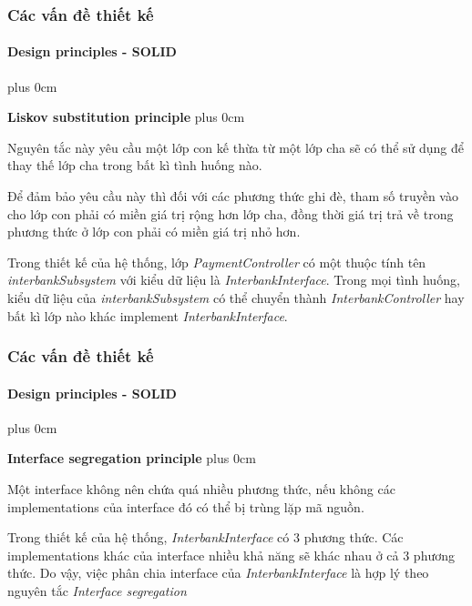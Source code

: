 \documentclass[11pt]{beamer}
\renewcommand{\raggedright}{\leftskip=0pt \rightskip=0pt plus 0cm}
\let\olditemize=\itemize
\renewenvironment{itemize}{\olditemize\raggedright}{\endlist}
\begin{document}
\begin{frame}[plain]
	\frametitle{Các vấn đề thiết kế}
	\framesubtitle{Design principles - SOLID}
	\begin{itemize}
		\item \textbf{Liskov substitution principle}
		\begin{itemize}
			\item Nguyên tắc này yêu cầu một lớp con kế thừa từ một lớp cha sẽ có thể sử dụng để thay thế
lớp cha trong bất kì tình huống nào.\\[5pt]
			\item Để đảm bảo yêu cầu này thì đối với các phương thức ghi đè, tham số truyền vào cho lớp con phải có miền giá trị rộng hơn lớp cha, đồng thời giá trị trả về trong phương thức ở lớp con phải có miền giá trị nhỏ hơn.\\[5pt]
			\item Trong thiết kế của hệ thống, lớp \textit{PaymentController} có một thuộc tính tên \textit{interbankSubsystem} với kiểu dữ liệu là \textit{InterbankInterface}. Trong mọi tình huống, kiểu dữ liệu của \textit{interbankSubsystem} có thể chuyển thành \textit{InterbankController}  hay bất kì lớp nào khác implement \textit{InterbankInterface}.
		\end{itemize}
	\end{itemize}
\end{frame}
\begin{frame}[plain]
	\frametitle{Các vấn đề thiết kế}
	\framesubtitle{Design principles - SOLID}
	\begin{itemize}
		\item \textbf{Interface segregation principle}
		\begin{itemize}
			\item Một interface không nên chứa quá nhiều phương thức, nếu không các implementations của interface đó có thể bị trùng lặp mã nguồn.\\[5pt]
			\item Trong thiết kế của hệ thống, \textit{InterbankInterface} có 3 phương thức. Các implementations khác của interface nhiều khả năng sẽ khác nhau ở cả 3 phương thức. Do vậy, việc phân chia interface của \textit{InterbankInterface} là hợp lý theo nguyên tắc \textit{Interface segregation}\\[5pt]
		\end{itemize}
	\end{itemize}
\end{frame}
\end{document}
